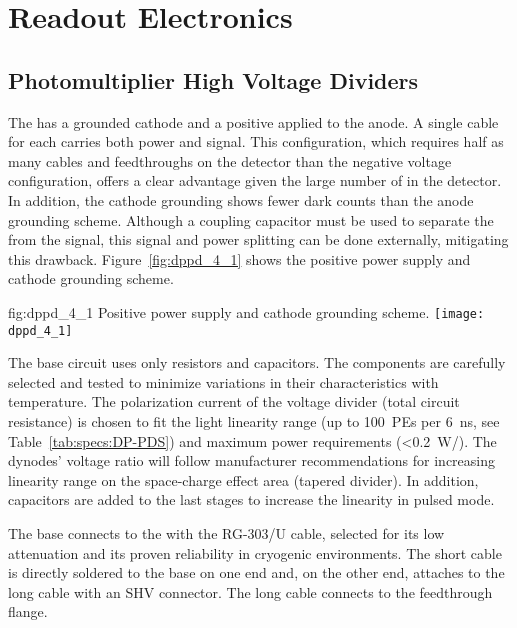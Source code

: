 \section{Readout Electronics}
\label{sec:dp-pds-electronics}

\subsection{Photomultiplier High Voltage Dividers}
\label{sec:fddp-pd-4.1}

The  has a grounded cathode and a positive  applied to the anode. A single cable for each  carries both power and signal. This configuration, which requires half as many cables and feedthroughs on the detector than the negative voltage configuration, offers a clear advantage given the large number of  in the detector. In addition, the cathode grounding shows fewer dark counts than the anode grounding scheme. Although a coupling capacitor must be used to separate the  from the  signal, this signal and power splitting can be done externally, mitigating this drawback.  Figure~\ref{fig:dppd_4_1} shows the positive power supply and cathode grounding scheme.

\begin{dunefigure}{fig:dppd_4_1}
{Positive power supply and cathode grounding scheme.}
\texttt{[image: dppd\_4\_1]}
\end{dunefigure}

The  base circuit uses only resistors and capacitors. The components are carefully selected and tested to minimize variations in their characteristics with temperature. The polarization current of the voltage divider (total circuit resistance) is chosen to fit the  light linearity range (up to \SI{100}{PEs} per \SI{6}{\ns}, see Table~\ref{tab:specs:DP-PDS}) and maximum power requirements (\SI{<0.2}{W/}). The dynodes' voltage ratio will follow manufacturer recommendations for increasing linearity range on the space-charge effect area (tapered divider). In addition, capacitors are added to the last stages  to increase the  linearity in pulsed mode.

The  base connects to the \fdth with the RG-303/U cable, selected for its low attenuation and its proven reliability in cryogenic environments. The short cable is directly soldered to the  base on one end and, on the other end, attaches to the long  cable with an SHV connector. The long cable connects to the feedthrough flange.

